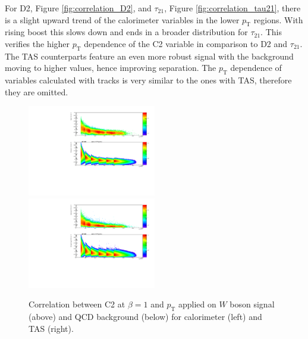For D2, Figure \ref{fig:correlation_D2}, and $\tau_{21}$, Figure \ref{fig:correlation_tau21}, there is a slight upward trend of the calorimeter variables in the lower $p_{\mathrm{T}}$ regions. With rising boost this slows down and ends in a broader distribution for $\tau_{21}$. This verifies the higher $p_{\mathrm{T}}$ dependence of the C2 variable in comparison to D2 and $\tau_{21}$. The TAS counterparts feature an even more robust signal with the background moving to higher values, hence improving separation. The $p_{\mathrm{T}}$ dependence of variables calculated with tracks is very similar to the ones with TAS, therefore they are omitted.
\begin{figure}[htp]
\includegraphics[width=0.5\textwidth]{sascha_input/plots/W/beta1/scatter_plots/scatter_h_scatter_reco_C2.pdf}
\bigskip
\includegraphics[width=0.5\textwidth]{sascha_input/plots/W/beta1/scatter_plots/scatter_h_scatter_assisted_tj_C2.pdf} 
\caption{{Correlation between C2 at $\beta=1$ and $p_{\mathrm{T}}$ applied on $W$ boson signal (above) and QCD background (below) for calorimeter (left) and TAS (right).}}\label{fig:correlation_C2}
\end{figure}
